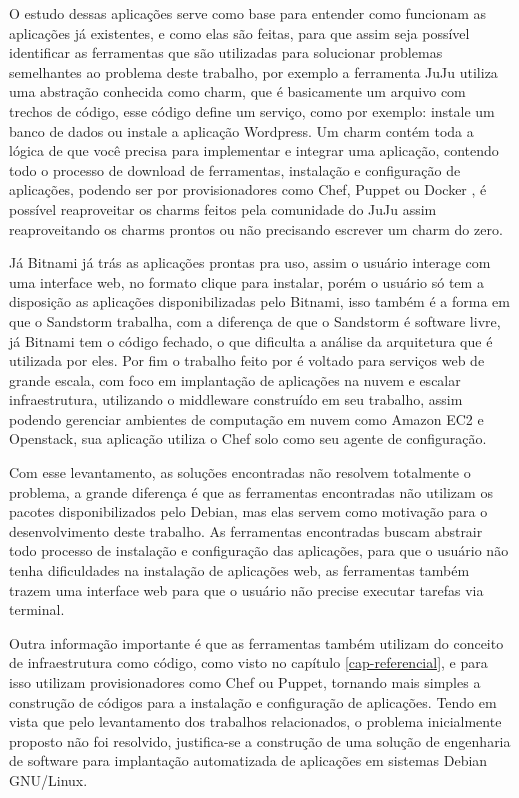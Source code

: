 O estudo dessas aplicações serve como base para entender como funcionam as aplicações
já existentes, e como elas são feitas, para que assim seja possível identificar 
as ferramentas que são
utilizadas para solucionar problemas semelhantes ao problema deste
trabalho, por exemplo a ferramenta JuJu utiliza uma abstração conhecida como charm,
que é basicamente um arquivo com trechos de código, esse código define um serviço, como por exemplo: instale um banco de dados ou instale a aplicação Wordpress. Um charm
contém toda a lógica de que você precisa para implementar e integrar uma aplicação,
contendo todo o processo de download de ferramentas, instalação e configuração de
aplicações, podendo ser por provisionadores como Chef, Puppet ou Docker \cite{juju},
é possível reaproveitar os charms feitos pela comunidade do JuJu assim
reaproveitando os charms prontos ou não precisando escrever um charm do zero.

Já Bitnami já trás as aplicações
prontas pra uso, assim o usuário interage com uma interface web, no formato clique para instalar, porém
o usuário só tem a disposição as aplicações disponibilizadas pelo Bitnami, isso
também é a forma em que o Sandstorm trabalha, com a diferença de que o Sandstorm é
software livre, já Bitnami tem o código fechado, o que dificulta a análise da arquitetura
que é utilizada por eles. Por fim o trabalho feito por \cite{leo2014} é voltado
para serviços web de grande escala, com foco em implantação de aplicações na
nuvem e escalar infraestrutura, utilizando o middleware construído em seu trabalho,
 assim podendo gerenciar ambientes de computação em nuvem
 como Amazon EC2 e Openstack, sua aplicação utiliza o Chef solo como seu agente de configuração.

Com esse levantamento, as soluções encontradas não resolvem totalmente
o problema, a grande diferença é que as ferramentas encontradas não utilizam os pacotes
disponibilizados pelo Debian, mas elas servem como motivação para o desenvolvimento
deste trabalho. As ferramentas encontradas buscam
abstrair todo processo de instalação e configuração das aplicações, para que o
usuário não tenha dificuldades na instalação de aplicações web, as ferramentas também
trazem uma interface web para que o usuário não precise executar tarefas via terminal.

Outra informação importante é que as ferramentas também utilizam do conceito de
infraestrutura como código, como visto no capítulo \ref{cap-referencial}, e para
isso utilizam provisionadores como Chef ou Puppet, tornando mais simples a
construção de códigos para a instalação e configuração de aplicações.
Tendo em vista que pelo levantamento dos trabalhos relacionados, o problema inicialmente
proposto não foi resolvido, justifica-se a construção de uma solução de engenharia
de software para implantação automatizada de aplicações em sistemas Debian GNU/Linux.

